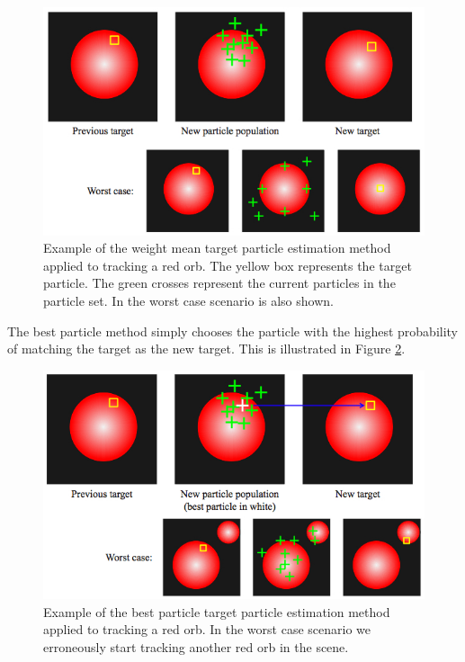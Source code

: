 \documentclass[11pt]{article}
\begin{document}
\begin{figure}[H]
\centering
\includegraphics[scale=.55]{img/weightedmean.jpg}
\caption{Example of the weight mean target particle estimation method applied to tracking a red orb. The yellow box represents the target particle. The green crosses represent the current particles in the particle set. In the worst case scenario is also shown.}
\label{fig:weightedmean}
\end{figure}

The best particle method simply chooses the particle with the highest probability of matching the target as the new target. This is illustrated in Figure \ref{fig:bestparticle}.

\begin{figure}[H]
\centering
\includegraphics[scale=.55]{img/bestparticle.jpg}
\caption{Example of the best particle target particle estimation method applied to tracking a red orb. In the worst case scenario we erroneously start tracking another red orb in the scene.}
\label{fig:bestparticle}
\end{figure}
\end{document}
